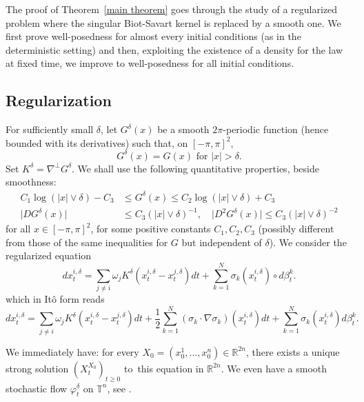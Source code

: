 \documentclass[11pt,a4paper]{article}%
\begin{document}
The proof of Theorem~\ref{main theorem} goes through  the study of a
regularized problem where the singular Biot-Savart kernel is
replaced by a smooth one. We first prove well-posedness for almost
every initial conditions (as in the deterministic setting) and then,
exploiting the existence   of a density for the law at fixed time,
we improve to well-posedness for all initial conditions.

\subsection{Regularization}

For sufficiently small $\delta$, let $G^{\delta}( x) $ be a smooth $2\pi
$-periodic function (hence bounded with its derivatives) such that, on $[
-\pi,\pi] ^{2}$,
\[
G^{\delta}( x) =G( x) \text{ for }\vert x\vert>\delta.
\]
Set $K^{\delta}=\nabla^{\perp}G^{\delta}$. We shall use the following
quantitative properties, beside smoothness:
\begin{align*}
C_{1}\log( \vert x\vert\vee\delta) -C_{3}  &  \leq G^{\delta}( x) \leq
C_{2}\log( \vert x\vert\vee\delta) +C_{3}\quad\\
\vert DG^{\delta}( x) \vert &  \leq C_{3}( \vert x\vert\vee\delta) ^{-1}%
,\quad\vert D^{2}G^{\delta}( x) \vert\leq C_{3}( \vert x\vert\vee\delta) ^{-2}%
\end{align*}
for all $x\in[ -\pi,\pi] ^{2}$, for some positive constants $C_{1},C_{2}%
,C_{3}$ (possibly different from those of the same inequalities for $G$ but independent of $\delta$).
We consider the regularized equation
\begin{equation}
dx_{t}^{i,\delta}=\sum_{j\neq i}\omega_{j}K^{\delta}( x_{t}^{i,\delta}%
-x_{t}^{j,\delta}) dt+\sum_{k=1}^{N}\sigma_{k}( x_{t}^{i,\delta})\circ d\beta
_{t}^{k}. \label{delta SDE}%
\end{equation}
which in It\^o form reads
\begin{equation}
dx_{t}^{i,\delta}=\sum_{j\neq i}\omega_{j}K^{\delta}( x_{t}^{i,\delta}%
-x_{t}^{j,\delta}) dt+\frac12 \sum_{k=1}^{N}(\sigma_{k}\cdot \nabla\sigma_{k})( x_{t}^{i,\delta}) dt +\sum_{k=1}^{N}\sigma_{k}( x_{t}^{i,\delta}) d\beta
_{t}^{k}. \label{delta SDE-Ito}%
\end{equation}

We immediately have: for every $X_{0}=( x_{0}^{1},...,x_{0}^{n}) \in
\mathbb{R}^{2n}$, there exists a unique strong solution $( X_{t}^{X_{0}})
_{t\geq0}$ to\ this equation in $\mathbb{R}^{2n}$. We even have a smooth
stochastic flow $\varphi_{t}^{\delta}$ on ${\mathbb{T}}^{n}$, see
\cite{Kunita}.
\end{document}
